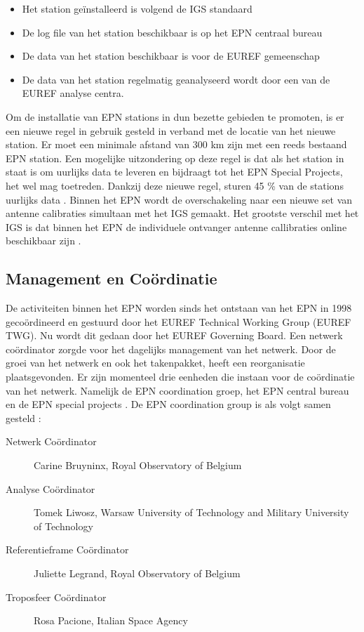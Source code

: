 \begin{itemize}
	\item Het station ge\"installeerd is volgend de IGS standaard
	\item De log file van het station beschikbaar is op het EPN centraal bureau
	\item De data van het station beschikbaar is voor de EUREF gemeenschap
	\item De data van het station regelmatig geanalyseerd wordt door een van de EUREF analyse centra. 
\end{itemize} 
Om de installatie van EPN stations in dun bezette gebieden te promoten, is er een nieuwe regel in gebruik gesteld in verband met de locatie van het nieuwe station. Er moet een minimale afstand van 300 km zijn met een reeds bestaand EPN station. Een mogelijke uitzondering op deze regel is dat als het station in staat is om uurlijks data te leveren en bijdraagt tot het EPN Special Projects, het wel mag toetreden. Dankzij deze nieuwe regel, sturen 45 \% van de stations uurlijks data \cite{LBibEPN6}. Binnen het EPN wordt de overschakeling naar een nieuwe set van antenne calibraties simultaan met het IGS gemaakt. Het grootste verschil met het IGS is dat binnen het EPN de individuele ontvanger antenne callibraties online beschikbaar zijn \cite{LBibEPN4}.

\subsection{Management en Co\"ordinatie}
De activiteiten binnen het EPN worden sinds het ontstaan van het EPN in 1998 geco\"ordineerd en gestuurd door het EUREF Technical Working Group (EUREF TWG). Nu wordt dit gedaan door het EUREF Governing Board.  Een netwerk co\"ordinator zorgde voor het dagelijks management van het netwerk. Door de groei van het netwerk en ook het takenpakket, heeft  een reorganisatie plaatsgevonden. Er zijn momenteel drie eenheden die instaan voor de co\"ordinatie van het netwerk. Namelijk de EPN coordination groep, het EPN central bureau en de EPN special projects \cite{LBibEPN6}. 
De EPN coordination group is als volgt samen gesteld \cite{LBibEPN8}:
\begin{description}
	\item[Netwerk Co\"ordinator] Carine Bruyninx, Royal Observatory of Belgium
	\item[Analyse Co\"ordinator] Tomek Liwosz, Warsaw University of Technology and Military University of Technology
	\item[Referentieframe Co\"ordinator] Juliette Legrand, Royal Observatory of Belgium
	\item[Troposfeer Co\"ordinator] Rosa Pacione, Italian Space Agency
\end{description}

